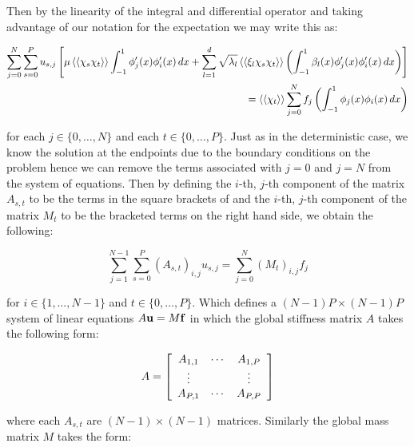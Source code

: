 Then by the linearity of the integral and differential operator and taking
advantage of our notation for the expectation
 we may write this as:

\begin{align}\label{eq:oned-stochastic-discrete}
  \begin{split}
      \sum_{j=0}^N\sum_{s=0}^Pu_{s,j}\left[
          \mu\left\langle\langle\chi_s\chi_t\right\rangle\rangle
          \int_{-1}^1\phi_j'(x)\phi_i'(x)\, dx +
          \sum_{l=1}^d\sqrt{\lambda_l}\left\langle\langle\xi_l\chi_s\chi_t\right\rangle\rangle
          \left(\int_{-1}^1 \beta_l(x)\phi_j'(x)\phi_i'(x)\, dx\right)
      \right]\\ =
      \left\langle\langle\chi_t\right\rangle\rangle\sum_{j=0}^Nf_j
          \left(\int_{-1}^1\phi_j(x)\phi_i(x)\, dx\right)
  \end{split}
\end{align}

for each $j \in \{0,\ldots,N\}$ and each $t \in \{0,\ldots,P\}$. Just as in the
deterministic case, we know the solution at the endpoints due to the boundary
conditions on the problem  hence we can remove the
terms associated with $j = 0$ and $j = N$ from the system of equations. Then by
defining the $i$-th, $j$-th component of the matrix $A_{s,t}$ to be the terms
in the square brackets of  and the $i$-th,
$j$-th component of the matrix $M_{t}$ to be the bracketed terms on the right
hand side, we obtain the following:

\begin{equation}
    \sum_{j=1}^{N - 1}\sum_{s=0}^P(A_{s,t})_{i,j}u_{s,j} =
    \sum_{j=0}^N(M_t)_{i,j}f_j
\end{equation}

for $i \in \{1,\ldots,N - 1\}$ and $t \in \{0,\ldots,P\}$. Which defines a
$(N - 1)P \times (N - 1)P$ system of linear equations $A\mathbf{u} = M\mathbf{f}$ in
which the global stiffness matrix $A$ takes the following form:

\begin{equation}
    A = \left[\begin{array}{c c c}
            A_{1,1} & \cdots & A_{1,P} \\
            \vdots & & \vdots \\
            A_{P,1} & \cdots & A_{P,P}
        \end{array}\right]
\end{equation}

where each $A_{s,t}$ are $(N - 1) \times (N - 1)$ matrices. Similarly the
global mass matrix $M$ takes the form:


